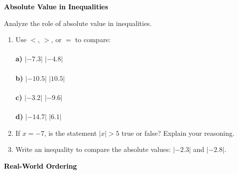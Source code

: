 \documentclass[12pt, letterpaper, fleqn]{article}
\newcommand{\blankshorter}{\underline{\hspace{1.5cm}}}
\begin{document}
\newpage

\begin{tcolorbox}[colback=black!10]
\large\textcolor{black}{\textbf{Absolute Value in Inequalities}}
\end{tcolorbox}

\noindent
Analyze the role of absolute value in inequalities.

\vspace{3mm}

\begin{enumerate}[itemsep=2.2cm, leftmargin=0.6cm]

\item Use $<$, $>$, or $=$ to compare: \\ \\
\textbf{a)} $|-7.3|$ \quad \blankshorter \quad $|-4.8|$ \\ \\
\textbf{b)} $|-10.5|$ \quad \blankshorter \quad $|10.5|$ \\ \\
\textbf{c)} $|-3.2|$ \quad \blankshorter \quad $|-9.6|$ \\ \\
\textbf{d)} $|-14.7|$ \quad \blankshorter \quad $|6.1|$

\vspace{-1cm}

\item If $x = -7$, is the statement $|x| > 5$ true or false? Explain your reasoning.

\vspace{2cm}

\item Write an inequality to compare the absolute values: $|-2.3|$ and $|-2.8|$.

\vspace{2cm}

\end{enumerate}

\newpage

\begin{tcolorbox}[colback=black!10]
\large\textcolor{black}{\textbf{Real-World Ordering}}
\end{tcolorbox}
\end{document}
